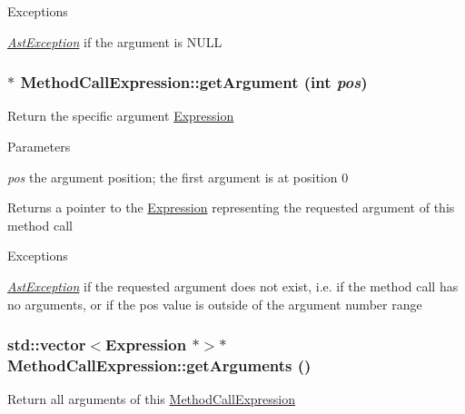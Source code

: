 \begin{DoxyExceptions}{Exceptions}
\item[{\em \hyperlink{classAstException}{AstException}}]if the argument is NULL \end{DoxyExceptions}
\hypertarget{classMethodCallExpression_a8fdb332750c263169f163cd15bf2181c}{
\subsubsection[{getArgument}]{$\ast$ MethodCallExpression::getArgument (int {\em pos})}}
\label{classMethodCallExpression_a8fdb332750c263169f163cd15bf2181c}
Return the specific argument \hyperlink{classExpression}{Expression}


\begin{DoxyParams}{Parameters}
\item[{\em pos}]the argument position; the first argument is at position 0 \end{DoxyParams}
\begin{DoxyReturn}{Returns}
a pointer to the \hyperlink{classExpression}{Expression} representing the requested argument of this method call 
\end{DoxyReturn}

\begin{DoxyExceptions}{Exceptions}
\item[{\em \hyperlink{classAstException}{AstException}}]if the requested argument does not exist, i.e. if the method call has no arguments, or if the pos value is outside of the argument number range \end{DoxyExceptions}
\hypertarget{classMethodCallExpression_ac8d64b39cf5cce5ff7baaef80e9c8911}{
\subsubsection[{getArguments}]{\setlength{\rightskip}{0pt plus 5cm}std::vector$<${\bf Expression} $\ast$$>$$\ast$ MethodCallExpression::getArguments ()}}
\label{classMethodCallExpression_ac8d64b39cf5cce5ff7baaef80e9c8911}
Return all arguments of this \hyperlink{classMethodCallExpression}{MethodCallExpression}

